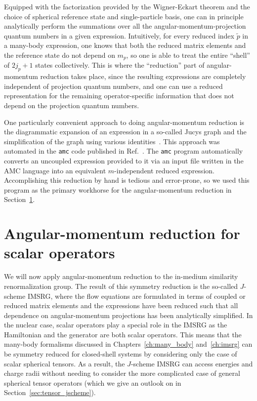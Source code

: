 Equipped with the factorization
provided by the Wigner-Eckart theorem
and the choice of spherical reference state
and single-particle basis,
one can in principle analytically perform the summations
over all the angular-momentum-projection quantum numbers
in a given expression.
Intuitively,
for every reduced index $\tilde{p}$ in a many-body expression,
one knows that both the reduced matrix elements
and the reference state do not depend on $m_p$,
so one is able to treat the entire ``shell''
of $2 j_p + 1$ states collectively.
This is where the ``reduction'' part of angular-momentum reduction
takes place,
since the resulting expressions
are completely independent of projection quantum numbers,
and one can use a reduced representation
for the remaining operator-specific information
that does not depend on the projection quantum numbers.

One particularly convenient approach to
doing angular-momentum reduction
is the diagrammatic expansion
of an expression in a so-called Jucys graph
and the simplification of the graph using various identities~\cite{Vars88angmom,Worm06angmom,Lind86angmom}.
This approach was automated in the \texttt{amc} code
published in Ref.~\cite{Tich20jcoupling}.
The \texttt{amc} program
automatically converts an uncoupled expression
provided to it via an input file written in the AMC language
into an equivalent $m$-independent reduced expression.
Accomplishing this reduction by hand
is tedious and error-prone,
so we used this program as the primary workhorse
for the angular-momentum reduction in Section~\ref{sec:amr_scalar}.

\section{Angular-momentum reduction for scalar operators}\label{sec:amr_scalar}

We will now apply angular-momentum reduction
to the in-medium similarity renormalization group.
The result of this symmetry reduction is the so-called $J$-scheme IMSRG,
where the flow equations are formulated
in terms of coupled or reduced matrix elements
and the expressions have been reduced
such that all dependence on angular-momentum projections
has been analytically simplified.
In the nuclear case,
scalar operators play a special role in the IMSRG
as the Hamiltonian and the generator are both scalar operators.
This means that the many-body formalisms
discussed in Chapters~\ref{ch:many_body} and~\ref{ch:imsrg}
can be symmetry reduced for closed-shell systems
by considering only the case of scalar spherical tensors.
As a result,
the $J$-scheme IMSRG can access energies and charge radii
without needing to consider the more complicated case
of general spherical tensor operators
(which we give an outlook on in Section~\ref{sec:tensor_jscheme}).

